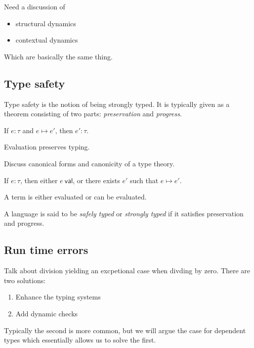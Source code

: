 Need a discussion of

\begin{itemize}
    \item structural dynamics
    \item contextual dynamics
\end{itemize}

Which are basically the same thing.

\subsection{Type safety}

Type safety is the notion of being strongly typed. It is typically given as a theorem consisting of two parts: \emph{preservation} and \emph{progress}.

\begin{defin}[Preservation]
    If $e : \tau$ and $e \mapsto e'$, then $e' : \tau$.
\end{defin}

Evaluation preserves typing.

Discuss canonical forms and canonicity of a type theory.

\begin{defin}[Progress]
    If $e : \tau$, then either $e\ \mathsf{val}$, or there exists $e'$ such that $e \mapsto e'$.
\end{defin}

A term is either evaluated or can be evaluated.

\begin{defin}
    A language is said to be \emph{safely typed} or \emph{strongly typed} if it satisfies preservation and progress.
\end{defin}

\subsection{Run time errors}

Talk about division yielding an excpetional case when divding by zero. There are two solutions:

\begin{enumerate}
    \item Enhance the typing systems
    \item Add dynamic checks
\end{enumerate}

Typically the second is more common, but we will argue the case for dependent types which essentially allows us to solve the first.

